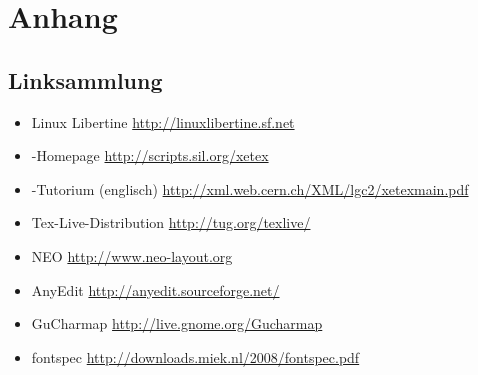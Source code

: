 \documentclass{fontdoku}
\begin{document}
%
%
%
%
%
%
%
%
%


\newpage
\section{Anhang}
\subsection{Linksammlung}

\begin{itemize}
   \item Linux Libertine \hfill\url{http://linuxlibertine.sf.net}
   \item \XeTeX-Homepage \hfill\url{http://scripts.sil.org/xetex}
   \item \XeTeX-Tutorium (englisch) \hfill\url{http://xml.web.cern.ch/XML/lgc2/xetexmain.pdf}
   \item Tex-Live-Distribution \hfill\url{http://tug.org/texlive/}
   \item NEO \hfill\url{http://www.neo-layout.org}
   \item AnyEdit \hfill\url{http://anyedit.sourceforge.net/}
   \item GuCharmap \hfill\url{http://live.gnome.org/Gucharmap}
   \item fontspec \hfill\url{http://downloads.miek.nl/2008/fontspec.pdf}
\end{itemize}
\end{document}
